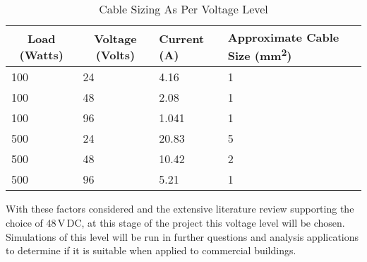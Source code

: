 \begin{table}[H]
\centering
\begin{tabular}{|l|l|l|p{5cm}|}
\hline
\multicolumn{1}{|c|}{\textbf{Load (Watts)}} & \multicolumn{1}{c|}{\textbf{Voltage (Volts)}} & \textbf{Current (A)} & \textbf{Approximate Cable Size (\si{mm^2})} \\ \hline
100 & 24 & 4.16 & 1 \\ \hline
100 & 48 & 2.08 & 1 \\ \hline
100 & 96 & 1.041 & 1 \\ \hline
500 & 24 & 20.83 & 5 \\ \hline
500 & 48 & 10.42 & 2 \\ \hline
500 & 96 & 5.21 & 1 \\ \hline
\end{tabular}
\caption{Cable Sizing As Per Voltage Level}
\label{table:lvdc-cables}
\end{table} 

With these factors considered and the extensive literature review supporting the choice of 48\,V\,DC, at this stage of the project this voltage level will be chosen. Simulations of this level will be run in further questions and analysis applications to determine if it is suitable when applied to commercial buildings.  

   

